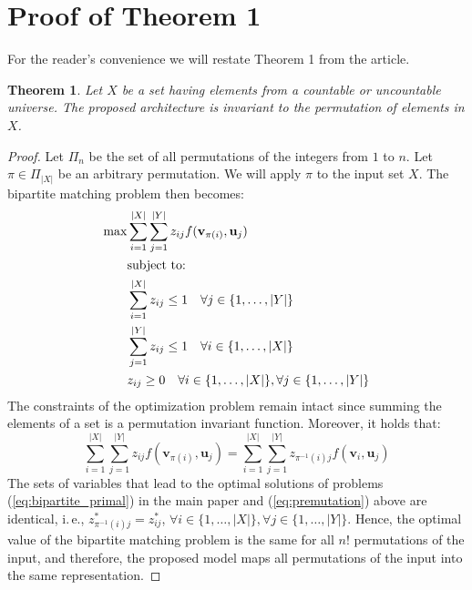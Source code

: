 \documentclass[twoside]{article}
\newcommand{\ie}{i.\,e., }
\newtheorem{theorem}{Theorem}
\begin{document}
\section{Proof of Theorem 1}\label{sec:proof_theorem}
For the reader's convenience we will restate Theorem 1 from the article.
\begin{theorem}
    Let $X$ be a set having elements from a countable or uncountable universe.
    The proposed architecture is invariant to the permutation of elements in $X$.
\end{theorem}
\begin{proof}
Let $\Pi_{n}$ be the set of all permutations of the integers from $1$ to $n$.
Let $\pi\in\Pi_{|X|}$ be an arbitrary permutation.
We will apply $\pi$ to the input set $X$.
The bipartite matching problem then becomes:
\begin{equation}
\begin{split}
  \max \displaystyle & \sum_{i=1}^{|X|} \sum_{j=1}^{|Y|} z_{ij} f(\mathbf{v}_{\pi(i)}, \mathbf{u}_j) \\
  & \textrm{subject to:} \\
  & \sum_{i=1}^{|X|} z_{ij} \leq 1 \quad \forall j \in \{ 1,\ldots,|Y| \} \\
  & \sum_{j=1}^{|Y|} z_{ij} \leq 1 \quad \forall i \in \{ 1,\ldots,|X| \} \\
  & z_{ij} \geq 0 \quad \forall i \in \{ 1,\ldots,|X| \}, \forall j \in \{ 1,\ldots,|Y| \} \\ 
\end{split}
\label{eq:premutation}
\end{equation}
The constraints of the optimization problem remain intact since summing the elements of a set is a permutation invariant function.
Moreover, it holds that: 
\begin{equation}
    \sum_{i=1}^{|X|} \sum_{j=1}^{|Y|} z_{ij} f(\mathbf{v}_{\pi(i)}, \mathbf{u}_j)=\sum_{i=1}^{|X|} \sum_{j=1}^{|Y|} z_{\pi^{-1}(i)j} f(\mathbf{v}_i, \mathbf{u}_j)
\end{equation}
The sets of variables that lead to the optimal solutions of problems (\ref{eq:bipartite_primal}) in the main paper and (\ref{eq:premutation}) above are identical, \ie $z^*_{\pi^{-1}(i)j}= z^*_{ij}$, $\forall i \in \{ 1,\ldots,|X| \}, \forall j \in \{ 1,\ldots,|Y| \}$.
Hence, the optimal value of the bipartite matching problem is the same for all $n!$ permutations of the input, and therefore, the proposed model maps all permutations of the input into the same representation.
\end{proof}
\end{document}
